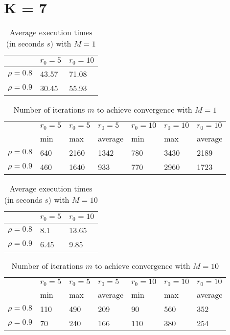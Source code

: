 \documentclass[a4paper,11pt,openright]{report}
\begin{document}
\section*{K = 7}
\begin{table}[H]
\centering
\addtolength{\leftskip}{-1.5cm}
\addtolength{\rightskip}{-1.5cm}
\begin{tabular}{|c|ll|}
\hline
$ $ & $r_0 = 5$ & $r_0 = 10$ \\
\hline
$\rho = 0.8$ & 43.57 & 71.08 \\
$\rho = 0.9$ & 30.45 & 55.93 \\
\hline
\end{tabular}
\caption{Average execution times (in seconds $s$) with $M = 1$}
\end{table}
\begin{table}[H]
\centering
\addtolength{\leftskip}{-1.5cm}
\addtolength{\rightskip}{-1.5cm}
\begin{tabular}{|c|llllll|}
\hline
$ $ & $r_0 = 5$ & $r_0 = 5$ & $r_0 = 5$ & $r_0 = 10$ & $r_0 = 10$ & $r_0 = 10$  \\
$ $ & min & max & average & min & max & average \\ 
\hline
$\rho = 0.8$ & 640 & 2160 & 1342 & 780 & 3430 & 2189\\
$\rho = 0.9$ & 460 & 1640 & 933 & 770 & 2960 & 1723 \\
\hline
\end{tabular}
\caption{Number of iterations $m$ to achieve convergence with $M = 1$}
\end{table}
\begin{table}[H]
\centering
\addtolength{\leftskip}{-1.5cm}
\addtolength{\rightskip}{-1.5cm}
\begin{tabular}{|c|ll|}
\hline
$ $ & $r_0 = 5$ & $r_0 = 10$ \\
\hline
$\rho = 0.8$ & 8.1 & 13.65 \\
$\rho = 0.9$ & 6.45 & 9.85 \\
\hline
\end{tabular}
\caption{Average execution times (in seconds $s$) with $M = 10$}
\end{table}
\begin{table}[H]
\centering
\addtolength{\leftskip}{-1.5cm}
\addtolength{\rightskip}{-1.5cm}
\begin{tabular}{|c|llllll|}
\hline
$ $ & $r_0 = 5$ & $r_0 = 5$ & $r_0 = 5$ & $r_0 = 10$ & $r_0 = 10$ & $r_0 = 10$  \\
$ $ & min & max & average & min & max & average \\ 
\hline
$\rho = 0.8$ & 110 & 490 & 209 & 90 & 560 & 352\\
$\rho = 0.9$ & 70 & 240 & 166 & 110 & 380 & 254 \\
\hline
\end{tabular}
\caption{Number of iterations $m$ to achieve convergence with $M = 10$}
\end{table}
\end{document}
